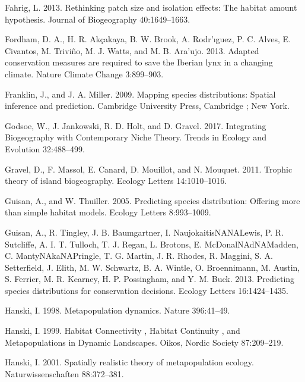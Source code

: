 \documentclass[12pt]{article}
\newlength{\cslhangindent}
\newenvironment{cslreferences}%
  {\setlength{\parindent}{0pt}%
  \everypar{\setlength{\hangindent}{\cslhangindent}}\ignorespaces}%
  {\par}
\begin{document}
\begin{cslreferences}
\leavevmode\hypertarget{ref-fahrig_rethinking_2013}{}%
Fahrig, L. 2013. Rethinking patch size and isolation effects: The
habitat amount hypothesis. Journal of Biogeography 40:1649--1663.

\leavevmode\hypertarget{ref-fordham_adapted_2013}{}%
Fordham, D. A., H. R. Akçakaya, B. W. Brook, A. Rodr\a'ıguez, P. C.
Alves, E. Civantos, M. Triviño, M. J. Watts, and M. B. Ara\a'ujo. 2013.
Adapted conservation measures are required to save the Iberian lynx in a
changing climate. Nature Climate Change 3:899--903.

\leavevmode\hypertarget{ref-franklin_mapping_2009}{}%
Franklin, J., and J. A. Miller. 2009. Mapping species distributions:
Spatial inference and prediction. Cambridge University Press, Cambridge
; New York.

\leavevmode\hypertarget{ref-godsoe_integrating_2017}{}%
Godsoe, W., J. Jankowski, R. D. Holt, and D. Gravel. 2017. Integrating
Biogeography with Contemporary Niche Theory. Trends in Ecology and
Evolution 32:488--499.

\leavevmode\hypertarget{ref-gravel_trophic_2011}{}%
Gravel, D., F. Massol, E. Canard, D. Mouillot, and N. Mouquet. 2011.
Trophic theory of island biogeography. Ecology Letters 14:1010--1016.

\leavevmode\hypertarget{ref-guisan_predicting_2005}{}%
Guisan, A., and W. Thuiller. 2005. Predicting species distribution:
Offering more than simple habitat models. Ecology Letters 8:993--1009.

\leavevmode\hypertarget{ref-guisan_predicting_2013}{}%
Guisan, A., R. Tingley, J. B. Baumgartner, I. NaujokaitisNANALewis, P.
R. Sutcliffe, A. I. T. Tulloch, T. J. Regan, L. Brotons, E.
McDonalNAdNAMadden, C. MantyNAkaNAPringle, T. G. Martin, J. R. Rhodes,
R. Maggini, S. A. Setterfield, J. Elith, M. W. Schwartz, B. A. Wintle,
O. Broennimann, M. Austin, S. Ferrier, M. R. Kearney, H. P. Possingham,
and Y. M. Buck. 2013. Predicting species distributions for conservation
decisions. Ecology Letters 16:1424--1435.

\leavevmode\hypertarget{ref-hanski_metapopulation_1998}{}%
Hanski, I. 1998. Metapopulation dynamics. Nature 396:41--49.

\leavevmode\hypertarget{ref-hanski_habitat_1999}{}%
Hanski, I. 1999. Habitat Connectivity , Habitat Continuity , and
Metapopulations in Dynamic Landscapes. Oikos, Nordic Society
87:209--219.

\leavevmode\hypertarget{ref-hanski_spatially_2001}{}%
Hanski, I. 2001. Spatially realistic theory of metapopulation ecology.
Naturwissenschaften 88:372--381.


\end{cslreferences}
\end{document}

